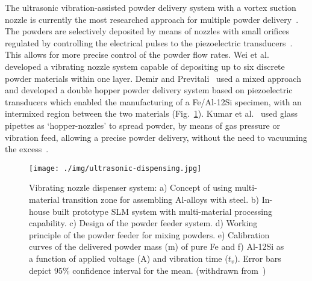 The ultrasonic vibration-assisted powder delivery system with a vortex suction
nozzle is currently the most researched approach for multiple powder
delivery~\cite{mussatto2022research}. The powders are selectively deposited by
means of nozzles with small orifices~\cite{stichel2014powder} regulated by controlling the electrical
pulses to the piezoelectric transducers~\cite{wei2019easy, zhang2019integrated, wei2019additive}. This allows for more precise control of
the powder flow rates. Wei et al.~\cite{wei2019additive} developed a vibrating
nozzle system capable of depositing up to six discrete powder materials within
one layer. Demir and
Previtali~\cite{demir2017multi} used a mixed approach and developed a double hopper powder delivery system
based on piezoelectric transducers which enabled the manufacturing of a
Fe/Al-12Si specimen, with an intermixed region between the two
materials (Fig.~\ref{fig:ultrasonic-dispensing}).
Kumar et al.~\cite{kumar2004direct} used glass pipettes as
`hopper-nozzles' to spread powder, by means of gas pressure or vibration
feed, allowing a precise powder delivery, without the need to vacuuming the
excess~\cite{kumar2004direct}.

\begin{figure}[!hbtp]
  \centering
  \texttt{[image: ./img/ultrasonic-dispensing.jpg]}
  \caption[Vibrating nozzle dispenser system]{Vibrating nozzle dispenser system:
    a) Concept of using multi-material transition zone for assembling Al-alloys
    with steel. b) In-house built prototype SLM system with multi-material
    processing capability. c) Design of the powder feeder system. d) Working
    principle of the powder feeder for mixing powders. e) Calibration curves of
    the delivered powder mass (m) of pure Fe and f) Al-12Si as a function of
    applied voltage (A) and vibration time ($t_v$). Error bars depict 95\%
    confidence interval for the mean. (withdrawn from~\cite{demir2017multi})\footnotemark}%
    \label{fig:ultrasonic-dispensing}
\end{figure}
%

